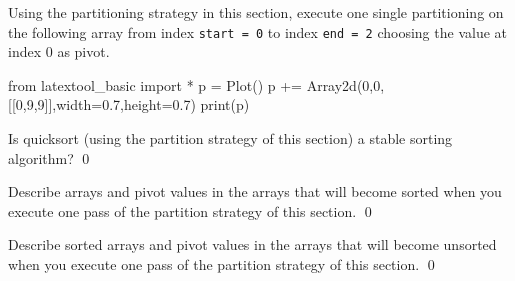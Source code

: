 \newpage
\begin{ex}
\begin{tightlist}
\item Using the partitioning strategy in this section,
execute one single partitioning on the following array
from index \verb!start = 0! to index \verb!end = 2!
choosing the value at index 0 as pivot.

\begin{python}
from latextool_basic import *
p = Plot()
p += Array2d(0,0,[[0,9,9]],width=0.7,height=0.7)
print(p)
\end{python}

\item Is quicksort (using the partition strategy of this section)
a stable sorting algorithm?
\qed
\end{tightlist}
\end{ex}


\newpage
\begin{ex}
Describe arrays and pivot values in the arrays that will become
sorted when you execute one pass of the partition strategy of this section.
\qed
\end{ex}


\newpage
\begin{ex}
Describe sorted arrays and pivot values in the arrays that will become
unsorted when you execute one pass of the partition strategy of this section.
\qed
\end{ex}

